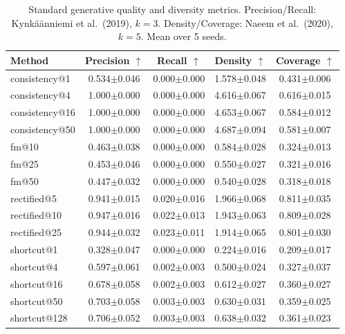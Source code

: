 \begin{table}[t]
\centering
\caption{Standard generative quality and diversity metrics. Precision/Recall: Kynk\"a\"anniemi et al.\ (2019), $k{=}3$. Density/Coverage: Naeem et al.\ (2020), $k{=}5$. Mean over 5 seeds.}
\label{tab:precision_recall}
\footnotesize
\begin{tabular}{lcccc}
\toprule
Method & Precision $\uparrow$ & Recall $\uparrow$ & Density $\uparrow$ & Coverage $\uparrow$ \\
\midrule
  consistency@1 & 0.534$\pm$0.046 & 0.000$\pm$0.000 & 1.578$\pm$0.048 & 0.431$\pm$0.006 \\
  consistency@4 & 1.000$\pm$0.000 & 0.000$\pm$0.000 & 4.616$\pm$0.067 & 0.616$\pm$0.015 \\
  consistency@16 & 1.000$\pm$0.000 & 0.000$\pm$0.000 & 4.653$\pm$0.067 & 0.584$\pm$0.012 \\
  consistency@50 & 1.000$\pm$0.000 & 0.000$\pm$0.000 & 4.687$\pm$0.094 & 0.581$\pm$0.007 \\
  fm@10 & 0.463$\pm$0.038 & 0.000$\pm$0.000 & 0.584$\pm$0.028 & 0.324$\pm$0.013 \\
  fm@25 & 0.453$\pm$0.046 & 0.000$\pm$0.000 & 0.550$\pm$0.027 & 0.321$\pm$0.016 \\
  fm@50 & 0.447$\pm$0.032 & 0.000$\pm$0.000 & 0.540$\pm$0.028 & 0.318$\pm$0.018 \\
  rectified@5 & 0.941$\pm$0.015 & 0.020$\pm$0.016 & 1.966$\pm$0.068 & 0.811$\pm$0.035 \\
  rectified@10 & 0.947$\pm$0.016 & 0.022$\pm$0.013 & 1.943$\pm$0.063 & 0.809$\pm$0.028 \\
  rectified@25 & 0.944$\pm$0.032 & 0.023$\pm$0.011 & 1.914$\pm$0.065 & 0.801$\pm$0.030 \\
  shortcut@1 & 0.328$\pm$0.047 & 0.000$\pm$0.000 & 0.224$\pm$0.016 & 0.209$\pm$0.017 \\
  shortcut@4 & 0.597$\pm$0.061 & 0.002$\pm$0.003 & 0.500$\pm$0.024 & 0.327$\pm$0.037 \\
  shortcut@16 & 0.678$\pm$0.058 & 0.002$\pm$0.003 & 0.612$\pm$0.027 & 0.360$\pm$0.027 \\
  shortcut@50 & 0.703$\pm$0.058 & 0.003$\pm$0.003 & 0.630$\pm$0.031 & 0.359$\pm$0.025 \\
  shortcut@128 & 0.706$\pm$0.052 & 0.003$\pm$0.003 & 0.638$\pm$0.032 & 0.361$\pm$0.023 \\
\bottomrule
\end{tabular}
\end{table}
